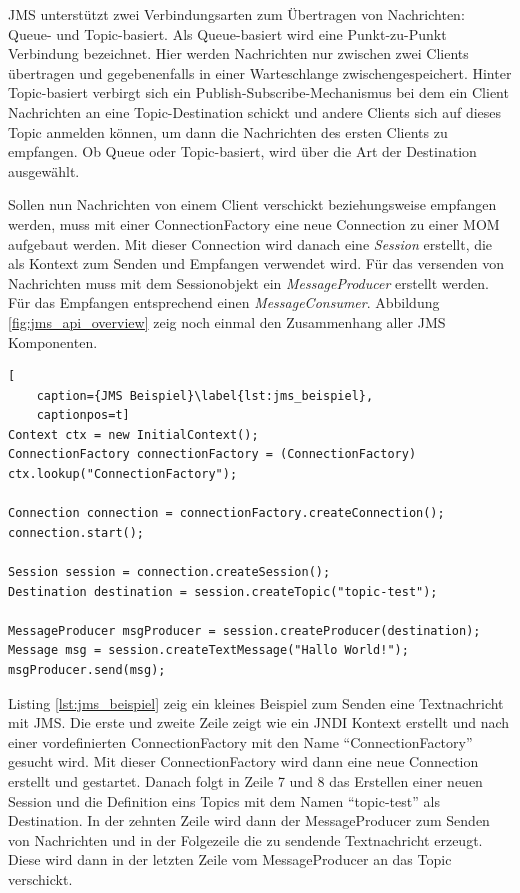 JMS unterstützt zwei Verbindungsarten zum Übertragen von Nachrichten: Queue- und Topic-basiert. Als Queue-basiert wird eine Punkt-zu-Punkt Verbindung bezeichnet. Hier werden Nachrichten nur zwischen zwei Clients übertragen und gegebenenfalls in einer Warteschlange zwischengespeichert. Hinter Topic-basiert verbirgt sich ein Publish-Subscribe-Mechanismus bei dem ein Client Nachrichten an eine Topic-Destination schickt und andere Clients sich auf dieses Topic anmelden können, um dann die Nachrichten des ersten Clients zu empfangen. Ob Queue oder Topic-basiert, wird über die Art der Destination ausgewählt.

Sollen nun Nachrichten von einem Client verschickt beziehungsweise empfangen werden, muss mit einer ConnectionFactory eine neue Connection zu einer MOM aufgebaut werden. Mit dieser Connection wird danach eine \emph{Session} erstellt, die als Kontext zum Senden und Empfangen verwendet wird. Für das versenden von Nachrichten muss mit dem Sessionobjekt ein \emph{MessageProducer} erstellt werden. Für das Empfangen entsprechend einen \emph{MessageConsumer}. Abbildung \ref{fig:jms_api_overview} zeig noch einmal den Zusammenhang aller JMS Komponenten.

\begin{lstlisting}[
    caption={JMS Beispiel}\label{lst:jms_beispiel},
    captionpos=t]
Context ctx = new InitialContext();
ConnectionFactory connectionFactory = (ConnectionFactory) ctx.lookup("ConnectionFactory");

Connection connection = connectionFactory.createConnection();
connection.start();

Session session = connection.createSession();
Destination destination = session.createTopic("topic-test");

MessageProducer msgProducer = session.createProducer(destination);
Message msg = session.createTextMessage("Hallo World!");
msgProducer.send(msg);
\end{lstlisting}

Listing \ref{lst:jms_beispiel} zeig ein kleines Beispiel zum Senden eine Textnachricht mit JMS. Die erste und zweite Zeile zeigt wie ein JNDI Kontext erstellt und nach einer vordefinierten ConnectionFactory mit den Name \enquote{ConnectionFactory} gesucht wird. Mit dieser ConnectionFactory wird dann eine neue Connection erstellt und gestartet. Danach folgt in Zeile 7 und 8 das Erstellen einer neuen Session und die Definition eins Topics mit dem Namen \enquote{topic-test} als Destination. In der zehnten Zeile wird dann der MessageProducer zum Senden von Nachrichten und in der Folgezeile die zu sendende Textnachricht erzeugt. Diese wird dann in der letzten Zeile vom MessageProducer an das Topic verschickt.

